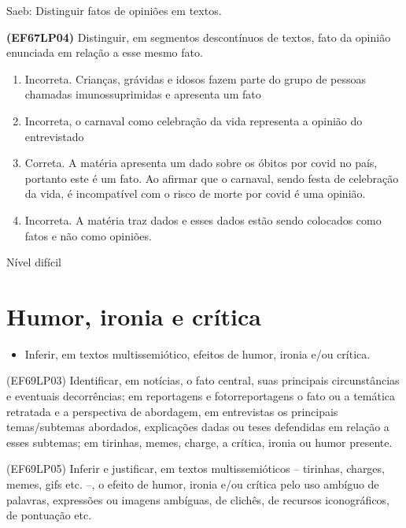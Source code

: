 {Saeb: Distinguir fatos de opiniões em textos.

\textbf{(EF67LP04)} Distinguir, em segmentos descontínuos de textos,
fato da opinião enunciada em relação a esse mesmo fato.

\begin{enumerate}
\def\labelenumi{\alph{enumi})}
\item
  Incorreta. Crianças, grávidas e idosos fazem parte do grupo de pessoas
  chamadas imunossuprimidas e apresenta um fato
\item
  Incorreta, o carnaval como celebração da vida representa a opinião do
  entrevistado
\item
  Correta. A matéria apresenta um dado sobre os óbitos por covid no
  país, portanto este é um fato. Ao afirmar que o carnaval, sendo festa
  de celebração da vida, é incompatível com o risco de morte por covid é
  uma opinião.
\item
  Incorreta. A matéria traz dados e esses dados estão sendo colocados
  como fatos e não como opiniões.
\end{enumerate}

Nível difícil

\pagestyle{port}
\chapter{Humor, ironia e crítica}

\begin{itemize}
\tightlist
\item
  Inferir, em textos multissemiótico, efeitos de humor, ironia e/ou
  crítica.
\end{itemize}

(EF69LP03) Identificar, em notícias, o fato central, suas principais
circunstâncias e eventuais decorrências; em reportagens e
fotorreportagens o fato ou a temática retratada e a perspectiva de
abordagem, em entrevistas os principais temas/subtemas abordados,
explicações dadas ou teses defendidas em relação a esses subtemas; em
tirinhas, memes, charge, a crítica, ironia ou humor presente.

(EF69LP05) Inferir e justificar, em textos multissemióticos -- tirinhas,
charges, memes, gifs etc. --, o efeito de humor, ironia e/ou crítica
pelo uso ambíguo de palavras, expressões ou imagens ambíguas, de
clichês, de recursos iconográficos, de pontuação etc.

}
